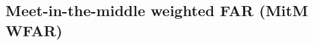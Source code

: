 
\newpage
\subsection{Meet-in-the-middle weighted FAR (MitM WFAR)}\label{sec:finite-automata-reduction}

